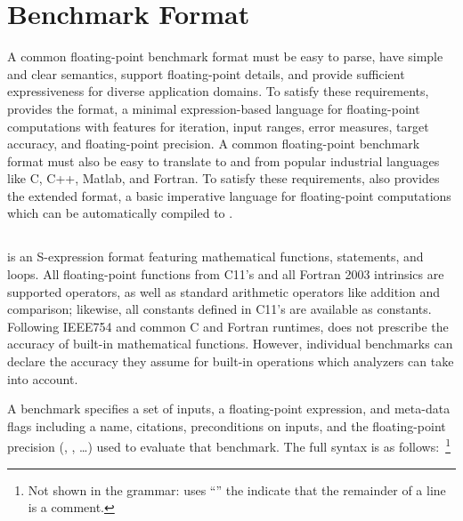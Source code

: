 \documentclass[main.tex]{subfiles}
\begin{document}
\section{Benchmark Format}
\label{sec:format}

A common floating-point benchmark format must be
  easy to parse,
  have simple and clear semantics,
  support floating-point details, and
  provide sufficient expressiveness for diverse application domains.
To satisfy these requirements,
  \name provides the \core format,
  a minimal expression-based language
  for floating-point computations
  with features for iteration, input ranges,
  error measures, target accuracy, and floating-point
  precision.
A common floating-point benchmark format
  must also be easy to translate to and from
  popular industrial languages like C, C++, Matlab, and Fortran.
To satisfy these requirements,
  \name also provides the extended \surface format,
  a basic imperative language for floating-point computations
  which can be automatically compiled to \core.

\subsection{\core}

\core is an S-expression format featuring
  mathematical functions,  statements, and  loops.
All floating-point functions
  from C11's  and all Fortran 2003 intrinsics
  are supported operators,
  as well as standard arithmetic operators like addition and comparison;
  likewise, all constants defined in C11's  are available as constants.
Following IEEE754 and common C and Fortran runtimes,
  \core does not prescribe the accuracy of built-in
  mathematical functions.
However, individual benchmarks can declare the accuracy
  they assume for built-in operations which
  analyzers can take into account.


A \core benchmark specifies a set of inputs,
  a floating-point expression,
  and meta-data flags including
  a name, citations, preconditions on inputs,
  and the floating-point precision
  (, , \ldots)
  used to evaluate that benchmark.
The full \core syntax is as follows:~\footnote{
Not shown in the grammar:
  \name uses ``\C{;}'' the indicate that
  the remainder of a line is a comment.}
\end{document}
